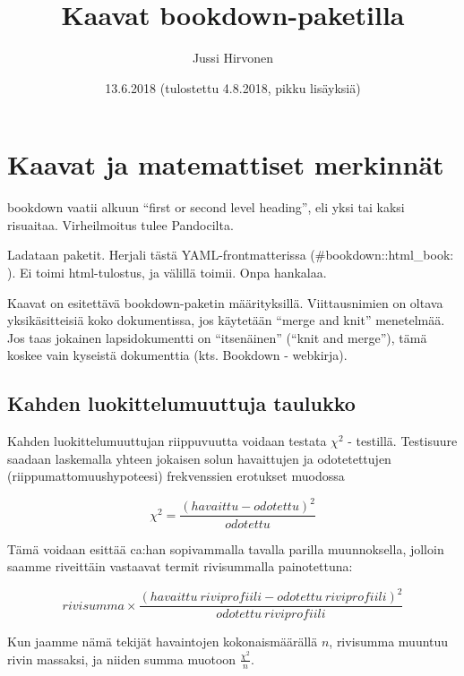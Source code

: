 \documentclass[finnish,]{article}
\title{Kaavat bookdown-paketilla}
\author{Jussi Hirvonen}
\date{13.6.2018 (tulostettu 4.8.2018, pikku lisäyksiä)}
\begin{document}
\maketitle

{
\setcounter{tocdepth}{2}
\tableofcontents
}
\hypertarget{kaavat-ja-matemattiset-merkinnat}{%
\section{Kaavat ja matemattiset
merkinnät}\label{kaavat-ja-matemattiset-merkinnat}}

bookdown vaatii alkuun ``first or second level heading'', eli yksi tai
kaksi risuaitaa. Virheilmoitus tulee Pandocilta.

Ladataan paketit. Herjali tästä YAML-frontmatterissa
(\#bookdown::html\_book: ). Ei toimi html-tulostus, ja välillä toimii.
Onpa hankalaa.

Kaavat on esitettävä bookdown-paketin määrityksillä. Viittausnimien on
oltava yksikäsitteisiä koko dokumentissa, jos käytetään ``merge and
knit'' menetelmää. Jos taas jokainen lapsidokumentti on ``itsenäinen''
(``knit and merge''), tämä koskee vain kyseistä dokumenttia (kts.
Bookdown - webkirja).

\hypertarget{kahden-luokittelumuuttuja-taulukko}{%
\subsection{Kahden luokittelumuuttuja
taulukko}\label{kahden-luokittelumuuttuja-taulukko}}

Kahden luokittelumuuttujan riippuvuutta voidaan testata \(\chi^{2}\) -
testillä. Testisuure saadaan laskemalla yhteen jokaisen solun
havaittujen ja odotetettujen (riippumattomuushypoteesi) frekvenssien
erotukset muodossa

\begin{equation}
  \chi^{2} = \frac{(havaittu - odotettu)^2} {odotettu}
    \label{eq:khii21}
\end{equation}

Tämä voidaan esittää ca:han sopivammalla tavalla parilla muunnoksella,
jolloin saamme riveittäin vastaavat termit rivisummalla painotettuna:

\begin{equation}
  rivisumma \times \frac{(havaittu \: riviprofiili - odotettu \: riviprofiili)^2} {odotettu \: riviprofiili}
    \label{eq:khii22}
\end{equation}

Kun jaamme nämä tekijät havaintojen kokonaismäärällä \(n\), rivisumma
muuntuu rivin massaksi, ja niiden summa muotoon \(\frac{\chi^{2}}{n}\).
\end{document}
